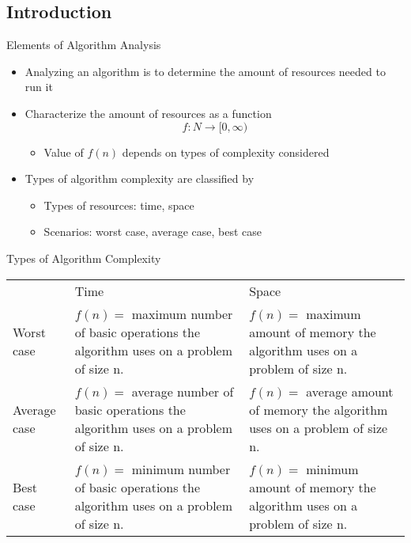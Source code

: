 

\subsection{Introduction}
\item Elements of Algorithm Analysis
  \begin{itemize}
  \item Analyzing an algorithm is to determine the amount of resources needed to run it
  \item Characterize the amount of resources as a function $$f:N\rightarrow[0,\infty)$$
    \begin{itemize}
    \item Value of $f(n)$ depends on types of complexity considered
    \end{itemize}
  \item Types of algorithm complexity are classified by
    \begin{itemize}
    \item Types of resources: time, space
    \item Scenarios: worst case, average case, best case
    \end{itemize}
  \end{itemize}
\item Types of Algorithm Complexity \\
\begin{tabular}{p{2cm} p{5cm} p{5cm}}
\rowcolor{LightCyan} & Time & Space \\
\rowcolor{DarkCyan} Worst case & $f(n)=$ maximum number of basic operations the algorithm uses on a problem of size n. & $f(n)=$ maximum amount of memory the algorithm uses on a problem of size n. \\
\rowcolor{LightCyan}  Average case & $f(n)=$ average number of basic operations the algorithm uses on a problem of size n. & $f(n)=$ average amount of memory the algorithm uses on a problem of size n. \\
\rowcolor{DarkCyan}  Best case & $f(n)=$ minimum number of basic operations the algorithm uses on a problem of size n. & $f(n)=$ minimum amount of memory the algorithm uses on a problem of size n. \\
\end{tabular}
